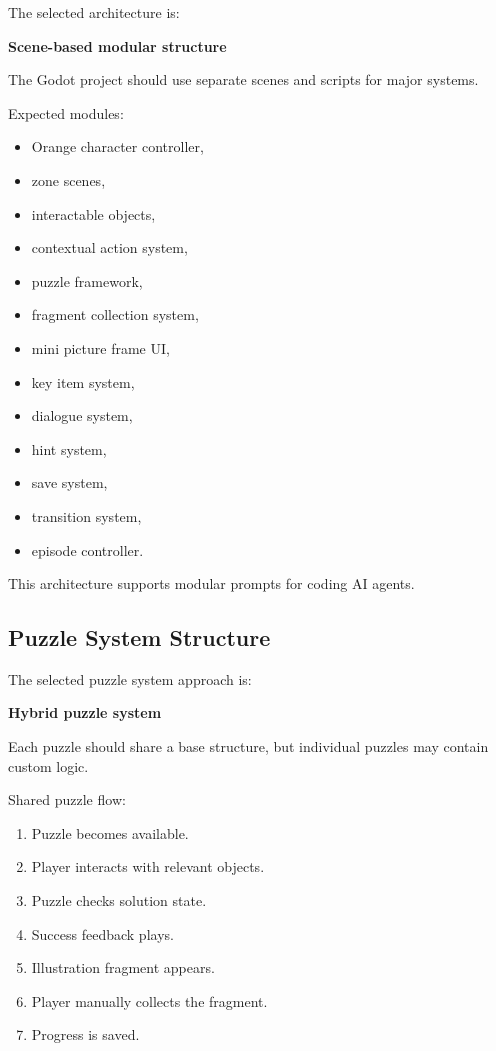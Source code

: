 \documentclass[12pt]{article}
\begin{document}
The selected architecture is:

\begin{center}
\textbf{Scene-based modular structure}
\end{center}

The Godot project should use separate scenes and scripts for major systems.

Expected modules:

\begin{itemize}[leftmargin=*]
    \item Orange character controller,
    \item zone scenes,
    \item interactable objects,
    \item contextual action system,
    \item puzzle framework,
    \item fragment collection system,
    \item mini picture frame UI,
    \item key item system,
    \item dialogue system,
    \item hint system,
    \item save system,
    \item transition system,
    \item episode controller.
\end{itemize}

This architecture supports modular prompts for coding AI agents.

\subsection{Puzzle System Structure}

The selected puzzle system approach is:

\begin{center}
\textbf{Hybrid puzzle system}
\end{center}

Each puzzle should share a base structure, but individual puzzles may contain custom logic.

Shared puzzle flow:

\begin{enumerate}[leftmargin=*]
    \item Puzzle becomes available.
    \item Player interacts with relevant objects.
    \item Puzzle checks solution state.
    \item Success feedback plays.
    \item Illustration fragment appears.
    \item Player manually collects the fragment.
    \item Progress is saved.
\end{enumerate}
\end{document}
